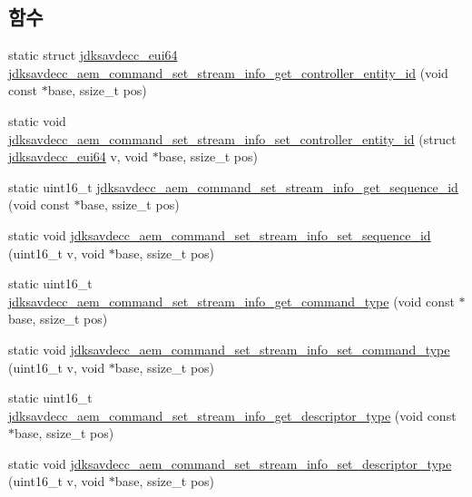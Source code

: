 \subsection*{함수}
\begin{DoxyCompactItemize}
\item 
static struct \hyperlink{structjdksavdecc__eui64}{jdksavdecc\+\_\+eui64} \hyperlink{group__command__set__stream__info_gaeab845c58fecc10bf92582d05e595638}{jdksavdecc\+\_\+aem\+\_\+command\+\_\+set\+\_\+stream\+\_\+info\+\_\+get\+\_\+controller\+\_\+entity\+\_\+id} (void const $\ast$base, ssize\+\_\+t pos)
\item 
static void \hyperlink{group__command__set__stream__info_ga3659a8a5e06dfa4ac32915a177855203}{jdksavdecc\+\_\+aem\+\_\+command\+\_\+set\+\_\+stream\+\_\+info\+\_\+set\+\_\+controller\+\_\+entity\+\_\+id} (struct \hyperlink{structjdksavdecc__eui64}{jdksavdecc\+\_\+eui64} v, void $\ast$base, ssize\+\_\+t pos)
\item 
static uint16\+\_\+t \hyperlink{group__command__set__stream__info_gacff8fffd2c5ed791583c85ad7da85564}{jdksavdecc\+\_\+aem\+\_\+command\+\_\+set\+\_\+stream\+\_\+info\+\_\+get\+\_\+sequence\+\_\+id} (void const $\ast$base, ssize\+\_\+t pos)
\item 
static void \hyperlink{group__command__set__stream__info_ga8fa6889c3f84ebdfd2570712d8975dd5}{jdksavdecc\+\_\+aem\+\_\+command\+\_\+set\+\_\+stream\+\_\+info\+\_\+set\+\_\+sequence\+\_\+id} (uint16\+\_\+t v, void $\ast$base, ssize\+\_\+t pos)
\item 
static uint16\+\_\+t \hyperlink{group__command__set__stream__info_ga6ee15f3e001f0a0673fd59befdff76df}{jdksavdecc\+\_\+aem\+\_\+command\+\_\+set\+\_\+stream\+\_\+info\+\_\+get\+\_\+command\+\_\+type} (void const $\ast$base, ssize\+\_\+t pos)
\item 
static void \hyperlink{group__command__set__stream__info_gaa0d39481f10d996eae75011328f74780}{jdksavdecc\+\_\+aem\+\_\+command\+\_\+set\+\_\+stream\+\_\+info\+\_\+set\+\_\+command\+\_\+type} (uint16\+\_\+t v, void $\ast$base, ssize\+\_\+t pos)
\item 
static uint16\+\_\+t \hyperlink{group__command__set__stream__info_ga0675b0a4a3ef453042df7a44d593254d}{jdksavdecc\+\_\+aem\+\_\+command\+\_\+set\+\_\+stream\+\_\+info\+\_\+get\+\_\+descriptor\+\_\+type} (void const $\ast$base, ssize\+\_\+t pos)
\item 
static void \hyperlink{group__command__set__stream__info_ga70c665181f5ec46124dd18debe6d4f23}{jdksavdecc\+\_\+aem\+\_\+command\+\_\+set\+\_\+stream\+\_\+info\+\_\+set\+\_\+descriptor\+\_\+type} (uint16\+\_\+t v, void $\ast$base, ssize\+\_\+t pos)

\end{DoxyCompactItemize}
